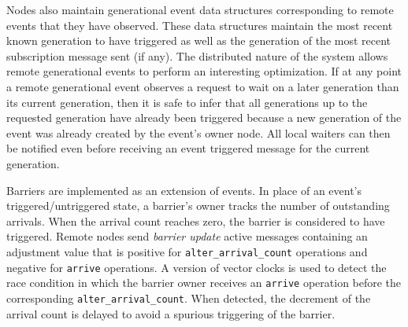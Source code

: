 Nodes also maintain generational event data structures corresponding to remote events that they have
observed.  These data structures maintain the most recent known generation to have triggered as well
as the generation of the most recent subscription message sent (if any).  The distributed nature
of the system allows remote generational events to perform an interesting optimization.  If at any point a
remote generational event observes a request to wait on a later generation than its current generation,
then it is safe to infer that all generations up to the requested generation have already 
been triggered because a new generation of the event was already created by the event's owner node.
All local waiters can then be notified even before receiving an event triggered message for the current generation.

Barriers are implemented as an extension of events.  In place of an event's triggered/untriggered state,
a barrier's owner tracks the number of outstanding arrivals.  When the arrival count 
reaches zero, the barrier is considered to have triggered.  Remote nodes send {\em barrier update}
active messages containing an adjustment value that is positive for {\tt alter\_arrival\_count} operations 
and negative for {\tt arrive} operations.  A version of vector clocks\cite{Fidge1998} is used
to detect the race condition in which the barrier owner receives an {\tt arrive} operation before the
corresponding {\tt alter\_arrival\_count}.  When detected, the decrement of the arrival count 
is delayed to avoid a spurious triggering of the barrier.

